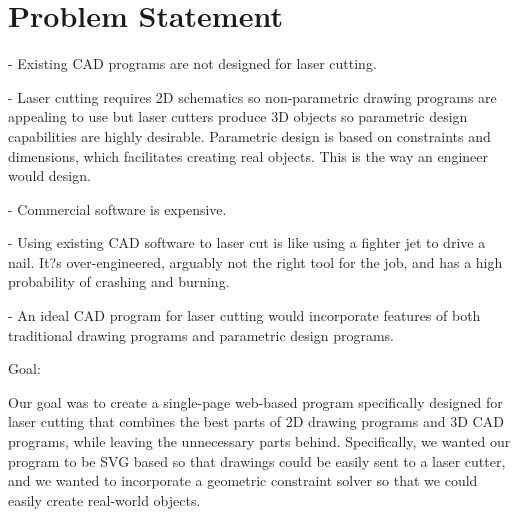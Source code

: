 \section{Problem Statement}


- Existing CAD programs are not designed for laser cutting.

- Laser cutting requires 2D schematics so non-parametric drawing programs are appealing to use but laser cutters produce 3D objects so parametric design capabilities are highly desirable. Parametric design is based on constraints and dimensions, which facilitates creating real objects. This is the way an engineer would design.

- Commercial software is expensive.

- Using existing CAD software to laser cut is like using a fighter jet to drive a nail. It?s over-engineered, arguably not the right tool for the job, and has a high probability of crashing and burning.

- An ideal CAD program for laser cutting would incorporate features of both traditional drawing programs and parametric design programs.

Goal:

Our goal was to create a single-page web-based program specifically designed for laser cutting that combines the best parts of 2D drawing programs and 3D CAD programs, while leaving the unnecessary parts behind. Specifically, we wanted our program to be SVG based so that drawings could be easily sent to a laser cutter, and we wanted to incorporate a geometric constraint solver so that we could easily create real-world objects.